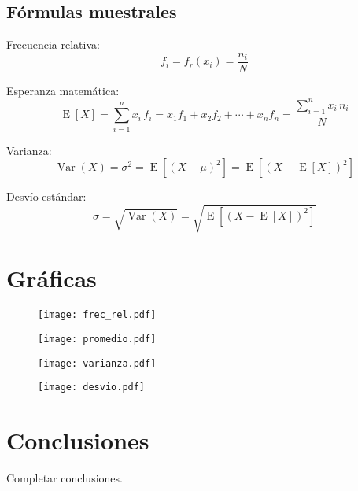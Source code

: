 \subsection{Fórmulas muestrales}
Frecuencia relativa:
\begin{equation}
f_{i} = f_{r}(x_{i}) = \frac {n_{i}}{N}
\end{equation}

Esperanza matemática:
\begin{equation}
\operatorname{E}[X] = \sum_{i=1}^{n}x_{i}\,f_{i}=x_{1}f_{1}+x_{2}f_{2}+\cdots +x_{n}f_{n} = \frac{\sum_{i=1}^{n}x_{i}\,n_{i}}{N}
\end{equation}

Varianza:
\begin{equation}
\operatorname{Var}(X) = \sigma^{2} = \operatorname{E}\left[(X - \mu)^{2}\right] = \operatorname{E}\left[(X - \operatorname{E}[X])^{2}\right]
\end{equation}

Desvío estándar:
\begin{equation}
\sigma = \sqrt{\operatorname{Var}(X)} = \sqrt{\operatorname{E}\left[(X - \operatorname{E}[X])^{2}\right]}
\end{equation}

\pagebreak  %
\section{Gráficas}
\begin{figure}[H]
  \centering
  \texttt{[image: frec\_rel.pdf]}
  \label{fig:frec_rel}
\end{figure}

\begin{figure}[H]
  \centering
  \texttt{[image: promedio.pdf]}
  \label{fig:promedio}
\end{figure}

\begin{figure}[H]
  \centering
  \texttt{[image: varianza.pdf]}
  \label{fig:varianza}
\end{figure}

\begin{figure}[H]
  \centering
  \texttt{[image: desvio.pdf]}
  \label{fig:desvio}
\end{figure}

\section{Conclusiones}
Completar conclusiones.

  

